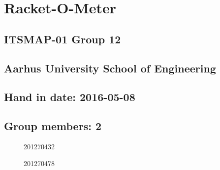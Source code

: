 \chapter*{Racket-O-Meter}

\section*{ITSMAP-01 Group 12}
\section*{Aarhus University School of Engineering}

\section*{Hand in date: 2016-05-08}

\section*{Group members: 2}

\begin{figure}[b]
	\center
	\signature{Bjørn Sørensen}{201270432}
	\signature{Jesper Oddershede Christensen}{201270478}
	\vspace{5cm}
\end{figure}

